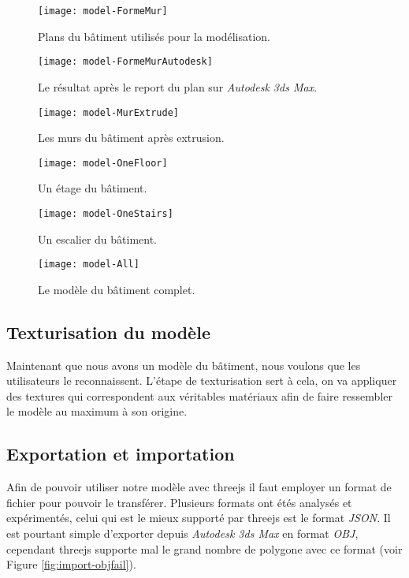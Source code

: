 \begin{figure}
\centering
\texttt{[image: model-FormeMur]}
\caption{Plans du bâtiment utilisés pour la modélisation.}
\label{fig:model-formemur}
\end{figure}

\begin{figure}
\centering
\texttt{[image: model-FormeMurAutodesk]}
\caption{Le résultat après le report du plan sur \textit{Autodesk 3ds Max}.}
\label{fig:model-formemurautodesk}
\end{figure}

\begin{figure}
	\centering
	\texttt{[image: model-MurExtrude]}
	\caption{Les murs du bâtiment après extrusion.}
	\label{fig:model-murextrude}
\end{figure}

\begin{figure}
	\centering
	\texttt{[image: model-OneFloor]}
	\caption{Un étage du bâtiment.}
	\label{fig:model-onefloor}
\end{figure}

\begin{figure}
	\centering
	\texttt{[image: model-OneStairs]}
	\caption{Un escalier du bâtiment.}
	\label{fig:model-onestairs}
\end{figure}

\begin{figure}
	\centering
	\texttt{[image: model-All]}
	\caption{Le modèle du bâtiment complet.}
	\label{fig:model-all}
\end{figure}


\subsection{Texturisation du modèle}
Maintenant que nous avons un modèle du bâtiment, nous voulons que les utilisateurs le reconnaissent. L'étape de texturisation sert à cela, on va appliquer des textures qui correspondent aux véritables matériaux afin de faire ressembler le modèle au maximum à son origine. 


\subsection{Exportation et importation}
Afin de pouvoir utiliser notre modèle avec threejs il faut employer un format de fichier pour pouvoir le transférer. Plusieurs formats ont étés analysés et expérimentés, celui qui est le mieux supporté par threejs est le format \emph{JSON}\cite{wiki-json}. Il est pourtant simple d'exporter depuis \textit{Autodesk 3ds Max} en format \emph{OBJ}, cependant threejs supporte mal le grand nombre de polygone avec ce format (voir Figure \ref{fig:import-objfail}).

